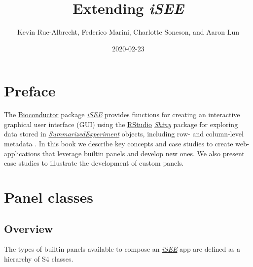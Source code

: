 \documentclass[]{book}
\title{Extending \emph{iSEE}}
\author{Kevin Rue-Albrecht, Federico Marini, Charlotte Soneson, and Aaron Lun}
\date{2020-02-23}
\begin{document}
\maketitle

{
\setcounter{tocdepth}{1}
\tableofcontents
}
\chapter*{Preface}\label{preface}

The \href{https://bioconductor.org/}{Bioconductor} package
\emph{\href{https://bioconductor.org/packages/3.11/iSEE}{iSEE}} provides
functions for creating an interactive graphical user interface (GUI)
using the \href{https://rstudio.com/}{RStudio}
\emph{\href{https://CRAN.R-project.org/package=Shiny}{Shiny}} package
for exploring data stored in
\emph{\href{https://bioconductor.org/packages/3.11/SummarizedExperiment}{SummarizedExperiment}}
objects, including row- and column-level metadata \citep{rue2018isee}.
In this book we describe key concepts and case studies to create
web-applications that leverage builtin panels and develop new ones. We
also present case studies to illustrate the development of custom
panels.

\hypertarget{panels}{\chapter{Panel classes}\label{panels}}

\section{Overview}\label{overview}

The types of builtin panels available to compose an
\emph{\href{https://bioconductor.org/packages/3.11/iSEE}{iSEE}} app are
defined as a hierarchy of S4 classes.
\end{document}
